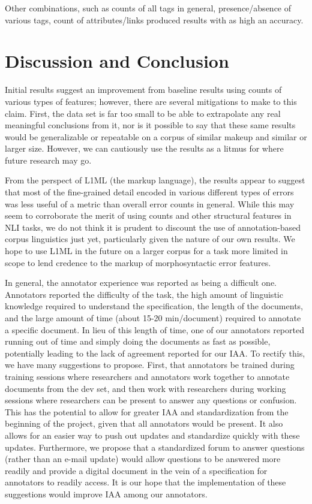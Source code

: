 \documentclass[10pt, a4paper]{article}
\begin{document}
Other combinations, such as counts of all tags in general, presence/absence of various tags, count of attributes/links produced results with as high an accuracy.

\section{Discussion and Conclusion\label{sec:discussion}}
Initial results suggest an improvement from baseline results using counts of various types of features; however, there are several mitigations to make to this claim. First, the data set is far too small to be able to extrapolate any real meaningful conclusions from it, nor is it possible to say that these same results would be generalizable or repeatable on a corpus of similar makeup and similar or larger size. However, we can cautiously use the results as a litmus for where future research may go. 

From the perspect of L1ML (the markup language), the results appear to suggest that most of the fine-grained detail encoded in various different types of errors was less useful of a metric than overall error counts in general. While this may seem to corroborate the merit of using counts and other structural features in NLI tasks, we do not think it is prudent to discount the use of annotation-based corpus linguistics just yet, particularly given the nature of our own results. We hope to use L1ML in the future on a larger corpus for a task more limited in scope to lend credence to the markup of morphosyntactic error features.

In general, the annotator experience was reported as being a difficult one. Annotators reported the difficulty of the task, the high amount of linguistic knowledge required to understand the specification, the length of the documents, and the large amount of time (about 15-20 min/document) required to annotate a specific document. In lieu of this length of time, one of our annotators reported running out of time and simply doing the documents as fast as possible, potentially leading to the lack of agreement reported for our IAA. To rectify this, we have many suggestions to propose. First, that annotators be trained during training sessions where researchers and annotators work together to annotate documents from the dev set, and then work with researchers during working sessions where researchers can be present to answer any questions or confusion. This has the potential to allow for greater IAA and standardization from the beginning of the project, given that all annotators would be present. It also allows for an easier way to push out updates and standardize quickly with these updates. Furthermore, we propose that a standardized forum to answer questions (rather than an e-mail update) would allow questions to be answered more readily and provide a digital document in the vein of a specification for annotators to readily access. It is our hope that the implementation of these suggestions would improve IAA among our annotators.
\end{document}
